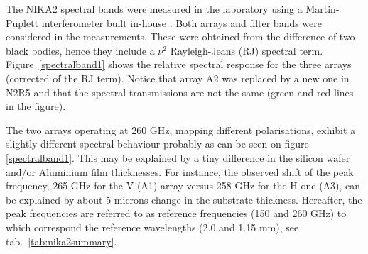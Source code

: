  

The NIKA2 spectral bands were measured in the laboratory using a
Martin-Puplett interferometer built in-house \cite{durand}.  Both
arrays and filter bands were considered in the measurements. These
were obtained from the difference of two black bodies, hence they
include a $\nu^2$ Rayleigh-Jeans (RJ) spectral term.
Figure~\ref{spectralband1} shows the relative spectral response for
the three arrays (corrected of the RJ term).  Notice that array A2 was
replaced by a new one in N2R5 and that the spectral transmissions are
not the same (green and red lines in the figure).

The two arrays operating at 260 GHz, mapping different polarisations,
exhibit a slightly different spectral behaviour probably as can be
seen on figure \ref{spectralband1}. This may be explained by a tiny
difference in the silicon wafer and/or Aluminium film thicknesses. For
instance, the observed shift of the peak frequency, 265 GHz for the V
(A1) array versus 258 GHz for the H one (A3), can be explained by
about 5 microns change in the substrate thickness. Hereafter, the peak
frequencies are referred to as reference frequencies (150 and 260 GHz)
to which correspond the reference wavelengths (2.0 and 1.15 mm), see
tab.~\ref{tab:nika2summary}.



